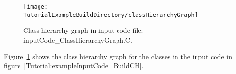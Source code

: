 \begin{figure}
\texttt{[image: \\TutorialExampleBuildDirectory/classHierarchyGraph]}
\caption{Class hierarchy graph in input code file: inputCode\_ClassHierarchyGraph.C.}
\label{Tutorial:exampleBuildCHGraph}
\end{figure}

   Figure~\ref{Tutorial:exampleBuildCHGraph} shows the class hierarchy graph for the
classes in the input code in figure~\ref{Tutorial:exampleInputCode_BuildCH}.



